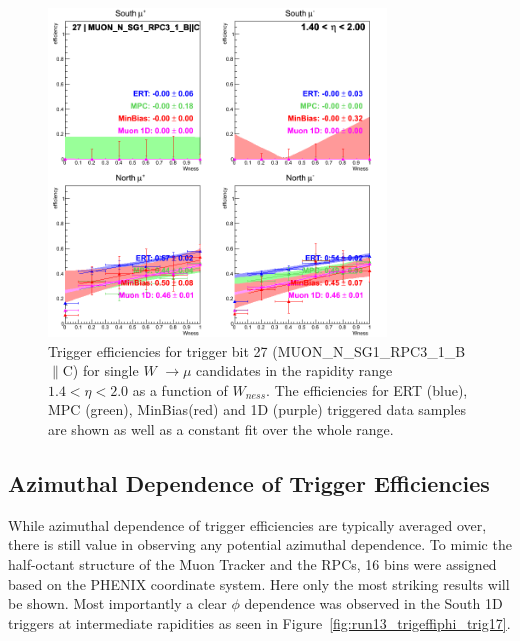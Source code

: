 \begin{figure}[h!]

  \centering

  \includegraphics[width=0.8\textwidth]{./figures/run13_trigeffisn_eta1_trig27_lin.png}
  \caption{\label{fig:run13_trigeffisn_eta1_nper0_trig27_lin} Trigger efficiencies for trigger bit 27 (MUON\_N\_SG1\_RPC3\_1\_B$\|$C) for single $W$ $\rightarrow \mu$ candidates in the rapidity range $ 1.4 < \eta < 2.0$ as a function of $W_{ness}$. The efficiencies for ERT (blue), MPC (green), MinBias(red) and 1D (purple) triggered data samples are shown as well as a constant fit over the whole range.}

\end{figure}
\clearpage

\clearpage
\subsection{Azimuthal Dependence of Trigger Efficiencies}

While azimuthal dependence of trigger efficiencies are typically averaged over,
there is still value in observing any potential azimuthal dependence. To mimic
the half-octant structure of the Muon Tracker and the RPCs, 16 bins were
assigned based on the PHENIX coordinate system. Here only the most striking
results will be shown. Most importantly a clear $\phi$ dependence was observed
in the South 1D triggers at intermediate rapidities as seen in
Figure~\ref{fig:run13_trigeffiphi_trig17}. 

